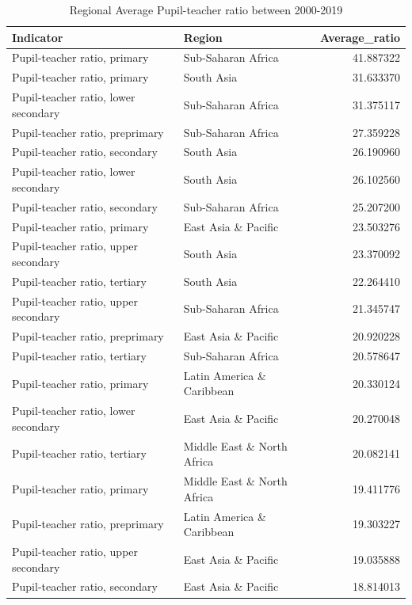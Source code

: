 \documentclass[11pt,a4paper,]{article}
\begin{document}
\begin{table}

\caption{\label{tab:Table3}Regional Average Pupil-teacher ratio between 2000-2019}
\centering
\begin{tabular}[t]{l|l|r}
\hline
Indicator & Region & Average\_ratio\\
\hline
Pupil-teacher ratio, primary & Sub-Saharan Africa & 41.887322\\
\hline
Pupil-teacher ratio, primary & South Asia & 31.633370\\
\hline
Pupil-teacher ratio, lower secondary & Sub-Saharan Africa & 31.375117\\
\hline
Pupil-teacher ratio, preprimary & Sub-Saharan Africa & 27.359228\\
\hline
Pupil-teacher ratio, secondary & South Asia & 26.190960\\
\hline
Pupil-teacher ratio, lower secondary & South Asia & 26.102560\\
\hline
Pupil-teacher ratio, secondary & Sub-Saharan Africa & 25.207200\\
\hline
Pupil-teacher ratio, primary & East Asia \& Pacific & 23.503276\\
\hline
Pupil-teacher ratio, upper secondary & South Asia & 23.370092\\
\hline
Pupil-teacher ratio, tertiary & South Asia & 22.264410\\
\hline
Pupil-teacher ratio, upper secondary & Sub-Saharan Africa & 21.345747\\
\hline
Pupil-teacher ratio, preprimary & East Asia \& Pacific & 20.920228\\
\hline
Pupil-teacher ratio, tertiary & Sub-Saharan Africa & 20.578647\\
\hline
Pupil-teacher ratio, primary & Latin America \& Caribbean & 20.330124\\
\hline
Pupil-teacher ratio, lower secondary & East Asia \& Pacific & 20.270048\\
\hline
Pupil-teacher ratio, tertiary & Middle East \& North Africa & 20.082141\\
\hline
Pupil-teacher ratio, primary & Middle East \& North Africa & 19.411776\\
\hline
Pupil-teacher ratio, preprimary & Latin America \& Caribbean & 19.303227\\
\hline
Pupil-teacher ratio, upper secondary & East Asia \& Pacific & 19.035888\\
\hline
Pupil-teacher ratio, secondary & East Asia \& Pacific & 18.814013\\

\end{tabular}
\end{table}
\end{document}
